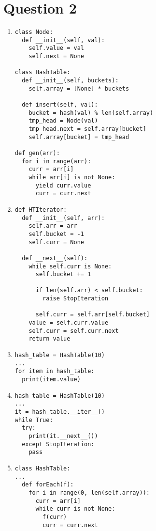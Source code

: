 \documentclass[13pt]{article}
\begin{document}
\section*{Question 2}
\begin{enumerate}[label=(\alph*)]
\item
\begin{verbatim}
class Node:
  def __init__(self, val):
    self.value = val
    self.next = None

class HashTable:
  def __init__(self, buckets):
    self.array = [None] * buckets

  def insert(self, val):
    bucket = hash(val) % len(self.array)
    tmp_head = Node(val)
    tmp_head.next = self.array[bucket]
    self.array[bucket] = tmp_head

def gen(arr):
  for i in range(arr):
    curr = arr[i]
    while arr[i] is not None:
      yield curr.value
      curr = curr.next
\end{verbatim}

\item
\begin{verbatim}
def HTIterator:
  def __init__(self, arr):
    self.arr = arr
    self.bucket = -1
    self.curr = None

  def __next__(self):
    while self.curr is None:
      self.bucket += 1

      if len(self.arr) < self.bucket:
        raise StopIteration

      self.curr = self.arr[self.bucket]
    value = self.curr.value
    self.curr = self.curr.next
    return value
\end{verbatim}

\item
\begin{verbatim}
hash_table = HashTable(10)
...
for item in hash_table:
  print(item.value)
\end{verbatim}

\item
\begin{verbatim}
hash_table = HashTable(10)
...
it = hash_table.__iter__()
while True:
  try:
    print(it.__next__())
  except StopIteration:
    pass
\end{verbatim}

\item
\begin{verbatim}
class HashTable:
...
  def forEach(f):
    for i in range(0, len(self.array)):
      curr = arr[i]
      while curr is not None:
        f(curr)
        curr = curr.next
\end{verbatim}
\end{enumerate}
\end{document}
